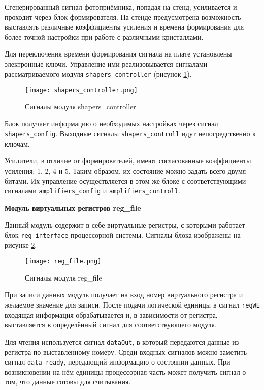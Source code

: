 Сгенерированный сигнал фотоприёмника, попадая на стенд, усиливается и проходит через блок формирователя. На стенде предусмотрена возможность выставлять различные коэффициенты усиления и времена формирования для более точной настройки при работе с различными кристаллами.\par
Для переключения времени формирования сигнала на плате установлены электронные ключи. Управление ими реализовывается сигналами рассматриваемого модуля \texttt{shapers\_controller} (рисунок \ref{fig:shapers_controller}).\par
\begin{figure}[ht]
    \centering
    \texttt{[image: shapers\_controller.png]}
    \caption{Сигналы модуля shapers\_controller}
    \label{fig:shapers_controller}
\end{figure}
Блок получает информацию о необходимых настройках через сигнал \texttt{shapers\_config}. Выходные сигналы \texttt{shapers\_controll} идут непосредственно к ключам.\par
Усилители, в отличие от формирователей, имеют согласованные коэффициенты усиления: 1, 2, 4 и 5. Таким образом, их состояние можно задать всего двумя битами. Их управление осуществляется в этом же блоке с соответствующими сигналами \texttt{amplifiers\_config} и \texttt{amplifiers\_controll}.\par
\textbf{Модуль виртуальных регистров reg\_file}\par
Данный модуль содержит в себе виртуальные регистры, с которыми работает блок \texttt{reg\_interface} процессорной системы. Сигналы блока изображены на рисунке \ref{fig:reg_file}. \par
\begin{figure}[ht]
    \centering
    \texttt{[image: reg\_file.png]}
    \caption{Сигналы модуля reg\_file}
    \label{fig:reg_file}
\end{figure}
При записи данных модуль получает на вход номер виртуального регистра и желаемое значение для записи. После подачи логической единицы в сигнал \texttt{regWE} входящая информация обрабатывается и, в зависимости от регистра, выставляется в определённый сигнал для соответствующего модуля.\par
Для чтения используется сигнал \texttt{dataOut}, в который передаются данные из регистра по выставленному номеру. Среди входных сигналов можно заметить сигнал \texttt{data\_ready}, передающий информацию о состоянии данных. При возникновении на нём единицы процессорная часть может получить сигнал о том, что данные готовы для считывания.\par
